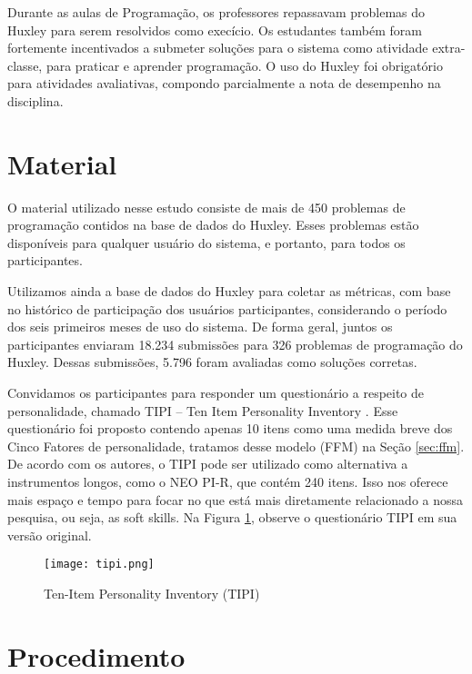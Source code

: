 Durante as aulas de Programação, os professores repassavam problemas do Huxley para serem resolvidos como execício. Os estudantes também foram fortemente incentivados a submeter soluções para o sistema como atividade extra-classe, para praticar e aprender programação. O uso do Huxley foi obrigatório para atividades avaliativas, compondo parcialmente a nota de desempenho na disciplina.

\section{Material}
\label{sec:material}

O material utilizado nesse estudo consiste de mais de 450 problemas de programação contidos na base de dados do Huxley. Esses problemas estão disponíveis para qualquer usuário do sistema, e portanto, para todos os participantes.

Utilizamos ainda a base de dados do Huxley para coletar as métricas, com base no histórico de participação dos usuários participantes, considerando o período dos seis primeiros meses de uso do sistema. De forma geral, juntos os participantes enviaram 18.234 submissões para 326 problemas de programação do Huxley. Dessas submissões, 5.796 foram avaliadas como soluções corretas.

Convidamos os participantes para responder um questionário a respeito de personalidade, chamado TIPI – Ten Item Personality Inventory \cite{gosling:03}. Esse questionário foi proposto contendo apenas 10 itens como uma medida breve dos Cinco Fatores de personalidade, tratamos desse modelo (FFM) na Seção \ref{sec:ffm}. De acordo com os autores, o TIPI pode ser utilizado como alternativa a instrumentos longos, como o NEO PI-R, que contém 240 itens. Isso nos oferece mais espaço e tempo para focar no que está mais diretamente relacionado a nossa pesquisa, ou seja, as soft skills. Na Figura \ref{fig:tipi}, observe o questionário TIPI em sua versão original.

\begin{figure}[h*]
\centering
\caption{\small Ten-Item Personality Inventory (TIPI)}
\texttt{[image: tipi.png]}
\label{fig:tipi}
\end{figure}

\section{Procedimento}
\label{sec:procedimento}

